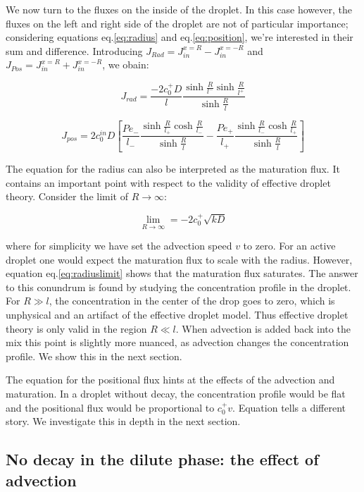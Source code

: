 \documentclass[12pt,a4paper,]{Dissertate}
\begin{document}
We now turn to the fluxes on the inside of the droplet. In this case
however, the fluxes on the left and right side of the droplet are not of
particular importance; considering equations eq.\ref{eq:radius} and
eq.\ref{eq:position}, we're interested in their sum and difference.
Introducing \(J_{Rad} = J_{in}^{x=R}-J_{in}^{x=-R}\) and
\(J_{Pos} = J_{in}^{x=R}+J_{in}^{x=-R}\), we obain:

\[
J_{rad} = \frac{-2c_0^+D}{l}\frac{\sinh\frac{R}{l^-}\sinh\frac{R}{l^+}}{\sinh\frac{R}{l}}
\]

\[
J_{pos} = 2c_0^{in}D\left[\frac{Pe_-}{l_-}\frac{\sinh\frac{R}{l_+}\cosh\frac{R}{l_-}}{\sinh\frac{R}{l}}-\frac{Pe_+}{l_+}\frac{\sinh\frac{R}{l_-}\cosh\frac{R}{l_+}}{\sinh\frac{R}{l}}\right]
\]

The equation for the radius can also be interpreted as the maturation
flux. It contains an important point with respect to the validity of
effective droplet theory. Consider the limit of \(R\to\infty\):

\begin{equation}
\lim_{R\to\infty} = -2c_0^+\sqrt{kD}
\label{eq:radiuslimit}\end{equation}

where for simplicity we have set the advection speed \(v\) to zero. For
an active droplet one would expect the maturation flux to scale with the
radius. However, equation eq.\ref{eq:radiuslimit} shows that the
maturation flux saturates. The answer to this conundrum is found by
studying the concentration profile in the droplet. For \(R\gg l\), the
concentration in the center of the drop goes to zero, which is
unphysical and an artifact of the effective droplet model. Thus
effective droplet theory is only valid in the region \(R\ll l\). When
advection is added back into the mix this point is slightly more
nuanced, as advection changes the concentration profile. We show this in
the next section.

The equation for the positional flux hints at the effects of the
advection and maturation. In a droplet without decay, the concentration
profile would be flat and the positional flux would be proportional to
\(c_0^+v\). Equation tells a different story. We investigate this in
depth in the next section.

\hypertarget{no-decay-in-the-dilute-phase-the-effect-of-advection}{%
\subsection{No decay in the dilute phase: the effect of
advection}\label{no-decay-in-the-dilute-phase-the-effect-of-advection}}
\end{document}
